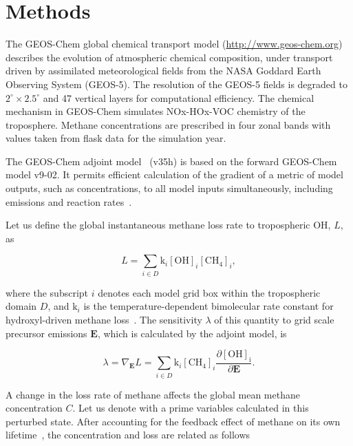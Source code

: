 \section{Methods}

The GEOS-Chem global chemical transport model (\url{http://www.geos-chem.org}) describes the evolution of atmospheric chemical composition, under transport driven by assimilated meteorological fields from the NASA Goddard Earth Observing System (GEOS-5). The resolution of the GEOS-5 fields is degraded to $2^{\circ} \times 2.5^{\circ}$ and 47 vertical layers for computational efficiency. The chemical mechanism in GEOS-Chem simulates NOx-HOx-VOC chemistry of the troposphere. Methane concentrations are prescribed in four zonal bands with values taken from flask data for the simulation year.


The GEOS-Chem adjoint model~\cite{ref:henze2007} (v35h) is based on the forward GEOS-Chem model v9-02. It permits efficient calculation of the gradient of a metric of model outputs, such as concentrations, to all model inputs simultaneously, including emissions and reaction rates~\cite{ref:walker2016}. 

Let us define the global instantaneous methane loss rate to tropospheric OH, $L$, as

\begin{equation}
L=\sum_{i \in D} \mathrm{k}_i \mathrm{[OH]}_i \mathrm{[CH_4]}_i,
\end{equation}

where the subscript $i$ denotes each model grid box within the tropospheric domain $D$, and $\mathrm{k}_i$ is the temperature-dependent bimolecular rate constant for hydroxyl-driven methane loss~\citep{ref:sander2011}. The sensitivity $\lambda$ of this quantity to grid scale precursor emissions $\mathbf{E}$, which is calculated by the adjoint model, is

\begin{equation}
\lambda = \nabla_\mathbf{E} L = \sum_{i \in D} \mathrm{k}_i \mathrm{[CH_4]}_i \frac{\partial \mathrm{[OH]_i}}{\partial \mathbf{E}}.
\end{equation}

A change in the loss rate of methane affects the global mean methane concentration $C$. Let us denote with a prime variables calculated in this perturbed state. After accounting for the feedback effect of methane on its own lifetime~\citep{ref:fuglesvedt1999, ref:naik2005}, the concentration and loss are related as follows

